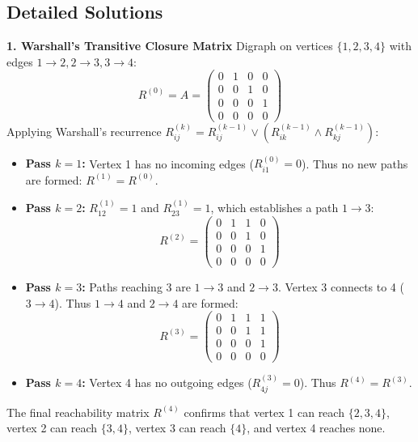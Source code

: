 \subsection*{Detailed Solutions}

\textbf{1. Warshall's Transitive Closure Matrix}
Digraph on vertices $\{1, 2, 3, 4\}$ with edges $1 \to 2, 2 \to 3, 3 \to 4$:
\begin{equation*}
R^{(0)} = A = \begin{pmatrix}
0 & 1 & 0 & 0 \\
0 & 0 & 1 & 0 \\
0 & 0 & 0 & 1 \\
0 & 0 & 0 & 0
\end{pmatrix}
\end{equation*}
Applying Warshall's recurrence $R^{(k)}_{ij} = R^{(k-1)}_{ij} \lor (R^{(k-1)}_{ik} \land R^{(k-1)}_{kj})$:
\begin{itemize}
    \item \textbf{Pass $k = 1$:} Vertex 1 has no incoming edges ($R^{(0)}_{i1} = 0$). Thus no new paths are formed: $R^{(1)} = R^{(0)}$.
    \item \textbf{Pass $k = 2$:} $R^{(1)}_{12} = 1$ and $R^{(1)}_{23} = 1$, which establishes a path $1 \to 3$:
    \begin{equation*}
    R^{(2)} = \begin{pmatrix}
    0 & 1 & 1 & 0 \\
    0 & 0 & 1 & 0 \\
    0 & 0 & 0 & 1 \\
    0 & 0 & 0 & 0
    \end{pmatrix}
    \end{equation*}
    \item \textbf{Pass $k = 3$:} Paths reaching 3 are $1 \to 3$ and $2 \to 3$. Vertex 3 connects to 4 ($3 \to 4$). Thus $1 \to 4$ and $2 \to 4$ are formed:
    \begin{equation*}
    R^{(3)} = \begin{pmatrix}
    0 & 1 & 1 & 1 \\
    0 & 0 & 1 & 1 \\
    0 & 0 & 0 & 1 \\
    0 & 0 & 0 & 0
    \end{pmatrix}
    \end{equation*}
    \item \textbf{Pass $k = 4$:} Vertex 4 has no outgoing edges ($R^{(3)}_{4j} = 0$). Thus $R^{(4)} = R^{(3)}$.
\end{itemize}
The final reachability matrix $R^{(4)}$ confirms that vertex 1 can reach $\{2, 3, 4\}$, vertex 2 can reach $\{3, 4\}$, vertex 3 can reach $\{4\}$, and vertex 4 reaches none.


